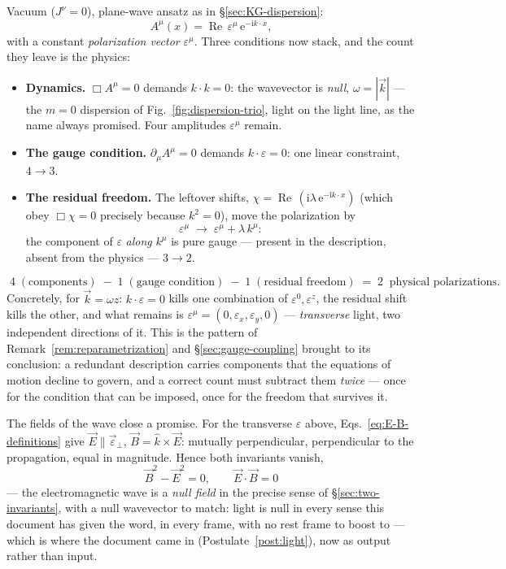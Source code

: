 \documentclass[11pt]{article}
\theoremstyle{plain}
\theoremstyle{definition}
\theoremstyle{remark}
\newcommand{\ee}{\mathrm{e}}
\newcommand{\ii}{\mathrm{i}}
\newcommand{\vE}{\vec{E}}
\newcommand{\vB}{\vec{B}}
\begin{document}
Vacuum ($J^\nu = 0$), plane-wave ansatz as in
\S\ref{sec:KG-dispersion}:
\begin{equation}
  A^\mu(x) = \operatorname{Re}\,
  \varepsilon^\mu\, \ee^{-\ii k\cdot x},
\end{equation}
with a constant \emph{polarization vector} $\varepsilon^\mu$. Three
conditions now stack, and the count they leave is the physics:
\begin{itemize}
  \item \textbf{Dynamics.} $\Box A^\mu = 0$ demands $k \cdot k = 0$:
  the wavevector is \emph{null}, $\omega = |\vec k|$ --- the $m = 0$
  dispersion of Fig.~\ref{fig:dispersion-trio}, light on the light
  line, as the name always promised. Four amplitudes
  $\varepsilon^\mu$ remain.
  \item \textbf{The gauge condition.} $\partial_\mu A^\mu = 0$
  demands $k \cdot \varepsilon = 0$: one linear constraint,
  $4 \to 3$.
  \item \textbf{The residual freedom.} The leftover shifts,
  $\chi = \operatorname{Re}\,(\ii\lambda\,\ee^{-\ii k\cdot x})$
  (which obey $\Box\chi = 0$ precisely because $k^2 = 0$), move the
  polarization by
  \begin{equation}
    \varepsilon^\mu \;\longrightarrow\;
    \varepsilon^\mu + \lambda\, k^\mu :
  \end{equation}
  the component of $\varepsilon$ \emph{along} $k^\mu$ is pure gauge
  --- present in the description, absent from the physics ---
  $3 \to 2$.
\end{itemize}
\begin{equation}
  \boxed{\;
  4 \;(\text{components})
  \;-\; 1 \;(\text{gauge condition})
  \;-\; 1 \;(\text{residual freedom})
  \;=\; 2 \;\;\text{physical polarizations.}
  \;}
\end{equation}
Concretely, for $\vec k = \omega\hat z$: $k\cdot\varepsilon = 0$
kills one combination of $\varepsilon^0, \varepsilon^z$, the residual
shift kills the other, and what remains is
$\varepsilon^\mu = (0, \varepsilon_x, \varepsilon_y, 0)$ ---
\emph{transverse} light, two independent directions of it. This is
the pattern of Remark~\ref{rem:reparametrization} and
\S\ref{sec:gauge-coupling} brought to its
conclusion: a redundant description carries components that the
equations of motion decline to govern, and a correct count must
subtract them \emph{twice} --- once for the condition that can be
imposed, once for the freedom that survives it.

The fields of the wave close a promise. For the transverse
$\varepsilon$ above, Eqs.~\eqref{eq:E-B-definitions} give
$\vE \parallel \vec\varepsilon_\perp$,
$\vB = \hat k \times \vE$: mutually perpendicular, perpendicular to
the propagation, equal in magnitude. Hence both invariants vanish,
\begin{equation}
  \vB^2 - \vE^2 = 0,
  \qquad
  \vE\cdot\vB = 0
\end{equation}
--- the electromagnetic wave is a \emph{null field} in the precise
sense of \S\ref{sec:two-invariants}, with a null wavevector to match:
light is null in every sense this document has given the word, in
every frame, with no rest frame to boost to --- which is where the
document came in (Postulate~\ref{post:light}), now as output rather
than input.
\end{document}
